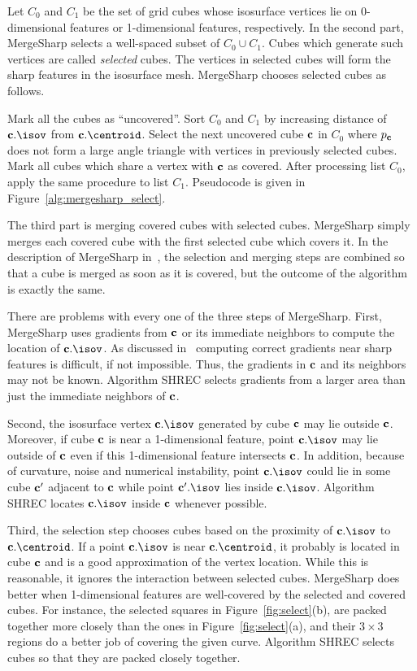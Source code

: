 Let $C_0$ and $C_1$ be the set of grid cubes whose isosurface vertices
lie on 0-dimensional features or 1-dimensional features, respectively.
In the second part, MergeSharp selects a well-spaced subset 
of $C_0 \cup C_1$.
Cubes which generate such vertices are called {\em selected} cubes.
The vertices in selected cubes will form the sharp features
in the isosurface mesh.
MergeSharp chooses selected cubes as follows.

Mark all the cubes as ``uncovered''.
Sort $C_0$ and $C_1$ by increasing distance
of $\cb.\isov$ from $\cb.\centroid$.
Select the next uncovered cube $\mathbf{c}$ in $C_0$
where $p_{\mathbf{c}}$ does not form a large angle triangle 
with vertices in previously selected cubes.
Mark all cubes which share a vertex with $\mathbf{c}$ as covered.
After processing list $C_0$, apply the same procedure to list $C_1$.
Pseudocode is given in Figure~\ref{alg:mergesharp_select}.

The third part is merging covered cubes with selected cubes.
MergeSharp simply merges each covered cube with the first selected cube
which covers it.
In the description of MergeSharp in~\cite{bw-cisec-13}, 
the selection and merging steps are combined
so that a cube is merged as soon as it is covered,
but the outcome of the algorithm is exactly the same.

There are problems with every one of the three steps of MergeSharp.
First, MergeSharp uses gradients from $\mathbf{c}$ or its immediate neighbors
to compute the location of $\cb.\isov$.
As discussed in~\cite{bw-crgsd-15}
computing correct gradients near sharp features is difficult,
if not impossible.
Thus, the gradients in $\mathbf{c}$ and its neighbors may not be known.
Algorithm SHREC selects gradients from a larger area
than just the immediate neighbors of $\mathbf{c}$.

Second, the isosurface vertex $\cb.\isov$ generated by cube $\mathbf{c}$
may lie outside $\mathbf{c}$.
Moreover, if cube $\mathbf{c}$ is near a 1-dimensional feature,
point $\cb.\isov$ may lie outside of $\mathbf{c}$
even if this 1-dimensional feature intersects $\mathbf{c}$.
In addition, because of curvature, noise and numerical instability,
point $\cb.\isov$ could lie in some cube $\mathbf{c}'$ adjacent to $\mathbf{c}$
while point $\cb'.\isov$ lies inside $\cb.\isov$.
Algorithm SHREC locates $\cb.\isov$ inside $\mathbf{c}$ whenever possible.

Third, the selection step chooses cubes based on the proximity
of $\cb.\isov$ to $\cb.\centroid$.
If a point $\cb.\isov$ is near $\cb.\centroid$,
it probably is located in cube $\mathbf{c}$ 
and is a good approximation of the vertex location.
While this is reasonable,
it ignores the interaction between selected cubes.
MergeSharp does better when 1-dimensional features are well-covered 
by the selected and covered cubes.
For instance, 
the selected squares in Figure~\ref{fig:select}(b), 
are packed together more closely
than the ones in Figure~\ref{fig:select}(a), 
and their $3 \times 3$ regions do a better job of covering
the given curve.
Algorithm SHREC selects cubes so that they are packed closely together.


